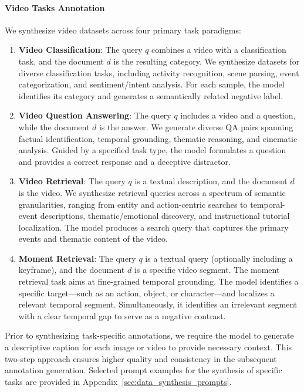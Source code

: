 \documentclass{article} %
\begin{document}
\paragraph{Video Tasks Annotation} We synthesize video datasets across four primary task paradigms:
\begin{enumerate}
    \item \textbf{Video Classification}: The query $q$ combines a video with a classification task, and the document $d$ is the resulting category. We synthesize datasets for diverse classification tasks, including activity recognition, scene parsing, event categorization, and sentiment/intent analysis. For each sample, the model identifies its category and generates a semantically related negative label. 
    \item \textbf{Video Question Answering}: The query $q$ includes a video and a question, while the document $d$ is the answer. We generate diverse QA pairs spanning factual identification, temporal grounding, thematic reasoning, and cinematic analysis. Guided by a specified task type, the model formulates a question and provides a correct response and a deceptive distractor.
    \item \textbf{Video Retrieval}: The query $q$ is a textual description, and the document $d$ is the video. We synthesize retrieval queries across a spectrum of semantic granularities, ranging from entity and action-centric searches to temporal-event descriptions, thematic/emotional discovery, and instructional tutorial localization. The model produces a search query that captures the primary events and thematic content of the video.
    \item \textbf{Moment Retrieval}:  The query $q$ is a textual query (optionally including a keyframe), and the document $d$ is a specific video segment. The moment retrieval task aims at fine-grained temporal grounding. The model identifies a specific target—such as an action, object, or character—and localizes a relevant temporal segment. Simultaneously, it identifies an irrelevant segment with a clear temporal gap to serve as a negative contrast.
\end{enumerate}
Prior to synthesizing task-specific annotations, we require the model to generate a descriptive caption for each image or video to provide necessary context. This two-step approach ensures higher quality and consistency in the subsequent annotation generation. Selected prompt examples for the synthesis of specific tasks are provided in Appendix~\ref{sec:data_synthesis_prompts}.
\end{document}
